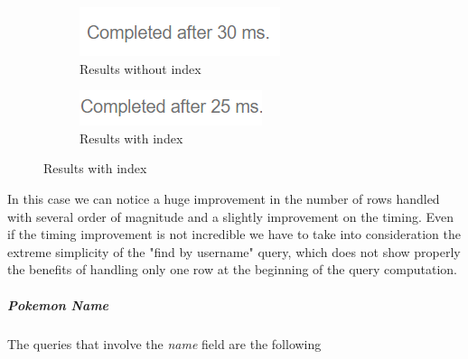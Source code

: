 \begin{figure}[H]
\begin{subfigure}{0.5\textwidth}
	\end{subfigure}
\end{figure}
\begin{figure}[H]
	\begin{subfigure}{0.5\textwidth}
		\includegraphics[width=0.9\linewidth]{img/user_without_index_2.png} 
		\caption{Results without index}
	\end{subfigure}
	\begin{subfigure}{0.5\textwidth}
		\includegraphics[width=0.9\linewidth]{img/user_with_index_2.png}
		\caption{Results with index}
	\end{subfigure}
\end{figure}

In this case we can notice a huge improvement in the number of rows handled with several order of magnitude and a slightly improvement on the timing. Even if the timing improvement is not incredible we have to take into consideration the extreme simplicity of the "find by username" query, which does not show properly the benefits of handling only one row at the beginning of the query computation. 

\subparagraph{Pokemon Name}
The queries that involve the \textit{name} field are the following

